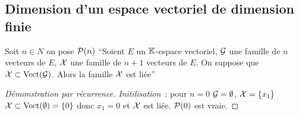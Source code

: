 \subsection{Dimension d'un espace vectoriel de dimension finie}

\begin{lemme}
  Soit \(n \in N\) on pose \(\P(n)\) ``Soient \(E\) un \(\K\)-espace vectoriel, \(\G\) une famille de \(n\) vecteurs de \(E\), \(\X\) une famille de \(n+1\) vecteurs de \(E\). On suppose que \(\X \subset \VectEngendre(\G)\). Alors la famille \(\X\) est liée''
\end{lemme}
\begin{proof}[Démonstration par récurrence]
  \emph{Initilisation}~: pour \(n=0\) \(\G=\emptyset\), \(\X=\{x_1\}\) \(\X \subset \VectEngendre(\emptyset)=\{0\}\) donc \(x_1=0\) et \(\X\) est liée. \(\P(0)\) est vraie.


\end{proof}
